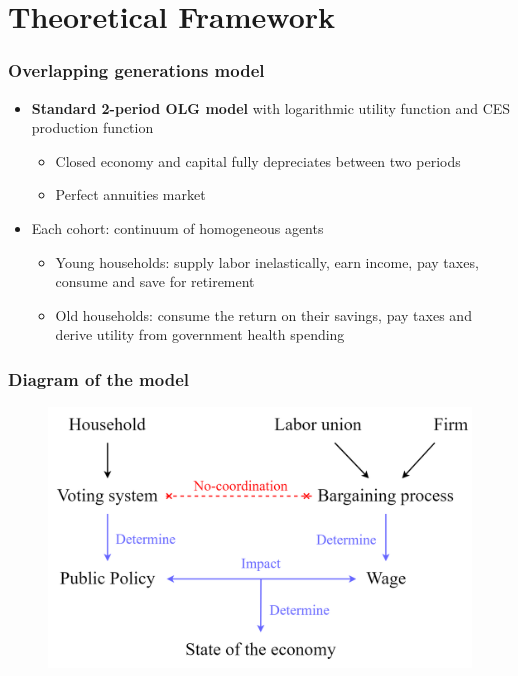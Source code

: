 \documentclass[usenames,dvipsnames]{beamer}
\begin{document}

	\section{Theoretical Framework}
	\begin{frame}[label = olgmodel]\frametitle{Overlapping generations model}
		\begin{itemize}
			\item \textbf{Standard 2-period OLG model} with logarithmic utility function and CES production function %
			\begin{itemize}
				\item Closed economy and capital fully depreciates between two periods
				\item Perfect annuities market
			\end{itemize}
		\vspace{1em}
			\item Each cohort: continuum of homogeneous agents
			\begin{itemize}
				\item Young households: supply labor inelastically, earn income, pay taxes, consume and save for retirement
				\item Old households: consume the return on their savings, pay taxes and derive utility from government health spending
			\end{itemize}
		\end{itemize}
	\end{frame}
	\begin{frame}\frametitle{Diagram of the model}
		\begin{figure}[ht]
			\centering
			\includegraphics[width=\linewidth]{Diagrams/model_diagram.png}
		\end{figure}
	\end{frame}
\end{document}

